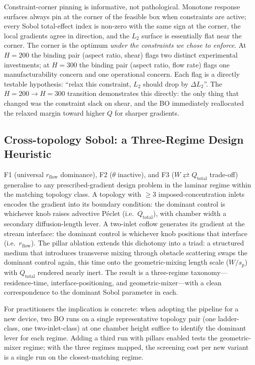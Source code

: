 \documentclass[12pt]{article}
\begin{document}
Constraint-corner pinning is informative, not pathological. Monotone response surfaces always pin at the corner of the feasible box when constraints are active; every Sobol total-effect index is non-zero with the same sign at the corner, the local gradients agree in direction, and the $L_2$ surface is essentially flat near the corner. The corner is the optimum \emph{under the constraints we chose to enforce}. At $H = 200$ the binding pair (aspect ratio, shear) flags two distinct experimental investments; at $H = 300$ the binding pair (aspect ratio, flow rate) flags one manufacturability concern and one operational concern. Each flag is a directly testable hypothesis: ``relax this constraint, $L_2$ should drop by $\Delta L_2$''. The $H = 200 \to H = 300$ transition demonstrates this directly: the only thing that changed was the constraint slack on shear, and the BO immediately reallocated the relaxed margin toward higher $Q$ for sharper gradients.

\subsection{Cross-topology Sobol: a Three-Regime Design Heuristic}
F1 (universal $r_{\text{flow}}$ dominance), F2 ($\theta$ inactive), and F3 ($W \rightleftarrows Q_{\text{total}}$ trade-off) generalise to any prescribed-gradient design problem in the laminar regime within the matching topology class. A topology with $\geq 3$ imposed-concentration inlets encodes the gradient into its boundary condition: the dominant control is whichever knob raises advective P\'eclet (i.e.\ $Q_{\text{total}}$), with chamber width a secondary diffusion-length lever. A two-inlet coflow generates its gradient at the stream interface: the dominant control is whichever knob positions that interface (i.e.\ $r_{\text{flow}}$). The pillar ablation extends this dichotomy into a triad: a structured medium that introduces transverse mixing through obstacle scattering swaps the dominant control again, this time onto the geometric-mixing length scale ($W / s_p$) with $Q_{\text{total}}$ rendered nearly inert. The result is a three-regime taxonomy---residence-time, interface-positioning, and geometric-mixer---with a clean correspondence to the dominant Sobol parameter in each.

For practitioners the implication is concrete: when adopting the pipeline for a new device, two BO runs on a single representative topology pair (one ladder-class, one two-inlet-class) at one chamber height suffice to identify the dominant lever for each regime. Adding a third run with pillars enabled tests the geometric-mixer regime; with the three regimes mapped, the screening cost per new variant is a single run on the closest-matching regime.
\end{document}
